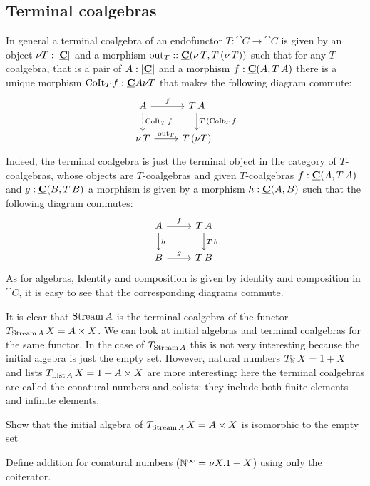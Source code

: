 \subsection{Terminal coalgebras}
\label{sec:terminal-coalgebras}

In general a terminal coalgebra of an endofunctor $T : \cat{C} \to \cat{C}$ is given by an object $\nu T : |\underline{\mathbf{C}}|$ and a morphism $\mathrm{out}_T : : \underline{\mathbf{C}}(\nu\,T,T\,(\nu\,T))$ such that for any $T$-coalgebra, that is a pair of $A : |\underline{\mathbf{C}}|$ and a morphism 
$f : \underline{\mathbf{C}}(A,T\,A)$ there is a unique morphism $\mathrm{CoIt}_T \,f: \underline{\mathbf{C}}{A}{\nu T}$
that makes the following diagram commute:
\[\begin{tikzcd}
A \arrow[d,"\CoIt_T \, f" right,dashrightarrow] \arrow[r,"f"]  & T\,A \arrow[d, "T\, (\CoIt_T \, f"]\\
\nu\,T  \arrow[r,"\out_T"] & T\,(\nu T) 
\end{tikzcd}\]  
Indeed, the terminal coalgebra is just the terminal object in the category of $T$-coalgebras, whose objects are $T$-coalgebras and given $T$-coalgebras $f : \underline{\mathbf{C}}(A,T\,A)$ and $g : \underline{\mathbf{C}}(B,T\,B)$ a morphism is given by a morphism $h : \underline{\mathbf{C}}(A,B)$ such that the following diagram commutes:
\[\begin{tikzcd}
 A \arrow[d,"h"] \arrow[r,"f"]  & T\,A \arrow[d,"T\,h"]\\
 B \arrow[r,"g"] & T\,B 
\end{tikzcd}\]  
As for algebras, Identity and composition is given by identity and composition in $\cat{C}$, it is easy to see that the corresponding diagrams commute. 

It is clear that $\mathrm{Stream}\,A$ is the terminal coalgebra of the functor $T_{\mathrm{Stream}\,A}\,X = A \times X$. We can look at initial algebras and terminal coalgebras for the same functor. In the case of $T_{\mathrm{Stream}\,A}$  this is not very interesting because the initial algebra is just the empty set. However, natural numbers $T_{\mathbb{N}}\,X = 1+X$ and lists $T_{\mathrm{List}\,A}\,X = 1 + A \times X$ are more interesting: here the terminal coalgebras are called the conatural numbers and colists: they include both finite elements and infinite elements. 

\begin{Exercise}
  Show that the initial algebra of $T_{\mathrm{Stream}\,A}\,X = A \times X$ is isomorphic to the empty set
\end{Exercise}

\begin{Exercise}
  Define addition for conatural numbers ($\mathbb{N}^\infty = \nu X.1+X$) using only the coiterator.
\end{Exercise}

